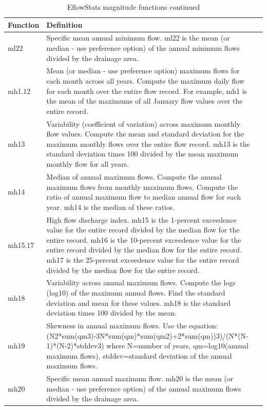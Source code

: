 \documentclass[a4paper,11pt]{article}\usepackage[]{graphicx}\usepackage[]{color}
\begin{document}
\begin{table}[ht]
  \centering
  \begin{threeparttable}[b]
  \caption{EflowStats magnitude functions continued}
  \label{tab:mag3Stats}
  \begin{tabularx}{\textwidth}{lXl}
  \hline
\textbf{Function} & \textbf{Definition} \\ 
  \hline
  ml22 & Specific mean annual minimum flow. ml22 is the mean (or median - use preference option) of the annual minimum flows divided by the drainage area. \\
  mh1.12 & Mean (or median - use preference option) maximum flows for each month across all years. Compute the maximum daily flow for each month over the entire flow record. For example, mh1 is the mean of the maximums of all January flow values over the entire record. \\
  mh13 & Variability (coefficient of variation) across maximum monthly flow values. Compute the mean and standard deviation for the maximum monthly flows over the entire flow record. mh13 is the standard deviation times 100 divided by the mean maximum monthly flow for all years. \\
  mh14 & Median of annual maximum flows. Compute the annual maximum flows from monthly maximum flows. Compute the ratio of annual maximum flow to median annual flow for each year. mh14 is the median of these ratios. \\
  mh15.17 & High flow discharge index. mh15 is the 1-percent exceedence value for the entire record divided by the median flow for the entire record. mh16 is the 10-percent exceedence value for the entire record divided by the median flow for the entire record. mh17 is the 25-percent exceedence value for the entire record divided by the median flow for the entire record. \\
  mh18 & Variability across annual maximum flows. Compute the logs (log10) of the maximum annual flows. Find the standard deviation and mean for these values. mh18 is the standard deviation times 100 divided by the mean. \\
  mh19 & Skewness in annual maximum flows. Use the equation: (N2*sum(qm3)-3N*sum(qm)*sum(qm2)+2*sum(qm))3)/(N*(N-1)*(N-2)*stddev3) where N=number of years, qm=log10(annual maximum flows), stddev=standard deviation of the annual maximum flows. \\
  mh20 & Specific mean annual maximum flow. mh20 is the mean (or median - use preference option) of the annual maximum flows divided by the drainage area. \\

\end{tabularx}
\end{threeparttable}
\end{table}
\end{document}
